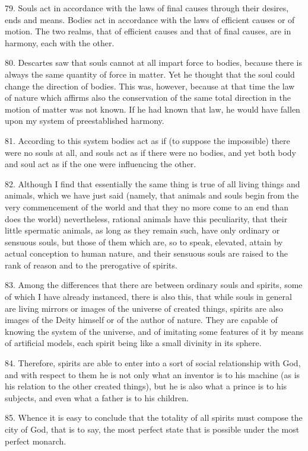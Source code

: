 79. Souls act in accordance with the laws of final causes through
their desires, ends and means. Bodies act in accordance with the laws
of efficient causes or of motion. The two realms, that of efficient
causes and that of final causes, are in harmony, each with the other.

80. Descartes saw that souls cannot at all impart force to bodies,
because there is always the same quantity of force in matter. Yet he
thought that the soul  could change the direction of bodies.
This was, however, because at that time the law of nature which
affirms also the conservation of the same total direction in the
motion of matter was not known. If he had known that law, he would
have fallen upon my system of preestablished harmony.

81. According to this system bodies act as if (to suppose the
impossible) there were no souls at all, and souls act as if there were
no bodies, and yet both body and soul act as if the one were
influencing the other.

82. Although I find that essentially the same thing is true of all
living things and animals, which we have just said (namely, that
animals and souls begin from the very commencement of the world and
that they no more come to an end than does the world) nevertheless,
rational animals have this peculiarity, that their little spermatic
animals, as long as they remain such, have only ordinary or sensuous
souls, but those of them which are, so to speak, elevated, attain by
actual conception to human nature, and their sensuous souls are
raised to the rank of reason and to the prerogative of spirits.

83. Among the differences that there are between ordinary souls and
spirits, some of which I have already instanced, there is also this,
that while souls in general are living mirrors or images of the
universe of created things, spirits are also images of the Deity
himself or of the author of nature. They are capable of knowing the
system of the universe, and of imitating some features of it by means
of artificial models, each spirit being like a small divinity in its
sphere.

84. Therefore, spirits are able to enter into a sort of social
relationship with God, and with respect to  them he is not
only what an inventor is to his machine (as is his relation to the
other created things), but he is also what a prince is to his
subjects, and even what a father is to his children.

85. Whence it is easy to conclude that the totality of all spirits
must compose the city of God, that is to say, the most perfect state
that is possible under the most perfect monarch.

